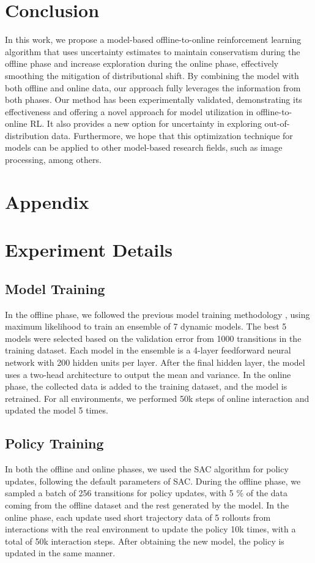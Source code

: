 \documentclass[letterpaper]{article} %
\begin{document}
\section{Conclusion}
In this work, we propose a model-based offline-to-online reinforcement learning algorithm that uses uncertainty estimates to maintain conservatism during the offline phase and increase exploration during the online phase, effectively smoothing the mitigation of distributional shift. By combining the model with both offline and online data, our approach fully leverages the information from both phases. Our method has been experimentally validated, demonstrating its effectiveness and offering a novel approach for model utilization in offline-to-online RL. It also provides a new option for uncertainty in exploring out-of-distribution data. Furthermore, we hope that this optimization technique for models can be applied to other model-based research fields, such as image processing, among others.

\section*{Appendix}
\appendix
\section{Experiment Details}
\label{a}
\subsection{Model Training}
In the offline phase, we followed the previous model training methodology \cite{mopo,combo}, using maximum likelihood to train an ensemble of 7 dynamic models. The best 5 models were selected based on the validation error from 1000 transitions in the training dataset. Each model in the ensemble is a 4-layer feedforward neural network with 200 hidden units per layer. After the final hidden layer, the model uses a two-head architecture to output the mean and variance. In the online phase, the collected data is added to the training dataset, and the model is retrained. For all environments, we performed 50k steps of online interaction and updated the model 5 times.

\subsection{Policy Training}
In both the offline and online phases, we used the SAC algorithm for policy updates, following the default parameters of SAC. During the offline phase, we sampled a batch of 256 transitions for policy updates, with 5 \% of the data coming from the offline dataset and the rest generated by the model. In the online phase, each update used short trajectory data of 5 rollouts from interactions with the real environment to update the policy 10k times, with a total of 50k interaction steps. After obtaining the new model, the policy is updated in the same manner.
\end{document}
